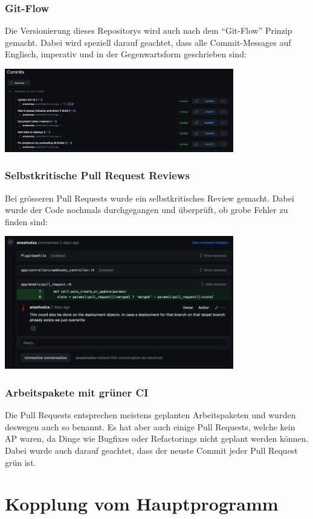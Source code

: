 \subsubsection{Git-Flow}
Die Versionierung dieses Repositorys wird auch nach dem \enquote{Git-Flow} Prinzip gemacht. Dabei wird
speziell darauf geachtet, dass alle Commit-Messages auf Englisch, imperativ und in der Gegenwartsform
geschrieben sind: 
\begin{center}
    \includegraphics[width=0.75\textwidth]{images/misc/git_commit_message.png}
    \label{fig:git_commit_message}
\end{center}
\subsubsection{Selbstkritische Pull Request Reviews}
Bei grösseren Pull Requests wurde ein selbstkritisches Review gemacht. Dabei wurde der Code nochmals
durchgegangen und überprüft, ob grobe Fehler zu finden sind:
\begin{center}
    \includegraphics[width=0.75\textwidth]{images/misc/git_pr_review.png}
    \label{fig:git_pr_review}
\end{center}
\subsubsection{Arbeitspakete mit \gls{grün}er CI}
Die Pull Requests entsprechen meistens geplanten Arbeitspaketen und wurden deswegen auch so benannt. Es hat
aber auch einige Pull Requests, welche kein AP waren, da Dinge wie Bugfixes oder Refactorings nicht geplant
werden können. \newline
Dabei wurde auch darauf geachtet, dass der neuste Commit jeder Pull Request grün ist.

\section{Kopplung vom Hauptprogramm}

